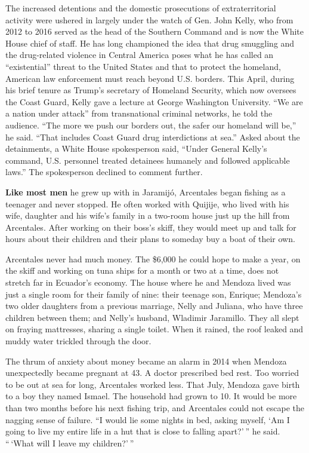 The increased detentions and the domestic prosecutions of
extraterritorial activity were ushered in largely under the watch of
Gen. John Kelly, who from 2012 to 2016 served as the head of the
Southern Command and is now the White House chief of staff. He has long
championed the idea that drug smuggling and the drug-related violence in
Central America poses what he has called an ``existential'' threat to
the United States and that to protect the homeland, American law
enforcement must reach beyond U.S. borders. This April, during his brief
tenure as Trump's secretary of Homeland Security, which now oversees the
Coast Guard, Kelly gave a lecture at George Washington University. ``We
are a nation under attack'' from transnational criminal networks, he
told the audience. ``The more we push our borders out, the safer our
homeland will be,'' he said. ``That includes Coast Guard drug
interdictions at sea.'' Asked about the detainments, a White House
spokesperson said, ``Under General Kelly's command, U.S. personnel
treated detainees humanely and followed applicable laws.'' The
spokesperson declined to comment further.

\textbf{Like most men} he grew up with in Jaramijó, Arcentales began
fishing as a teenager and never stopped. He often worked with Quijije,
who lived with his wife, daughter and his wife's family in a two-room
house just up the hill from Arcentales. After working on their boss's
skiff, they would meet up and talk for hours about their children and
their plans to someday buy a boat of their own.

Arcentales never had much money. The \$6,000 he could hope to make a
year, on the skiff and working on tuna ships for a month or two at a
time, does not stretch far in Ecuador's economy. The house where he and
Mendoza lived was just a single room for their family of nine: their
teenage son, Enrique; Mendoza's two older daughters from a previous
marriage, Nelly and Juliana, who have three children between them; and
Nelly's husband, Wladimir Jaramillo. They all slept on fraying
mattresses, sharing a single toilet. When it rained, the roof leaked and
muddy water trickled through the door.

The thrum of anxiety about money became an alarm in 2014 when Mendoza
unexpectedly became pregnant at 43. A doctor prescribed bed rest. Too
worried to be out at sea for long, Arcentales worked less. That July,
Mendoza gave birth to a boy they named Ismael. The household had grown
to 10. It would be more than two months before his next fishing trip,
and Arcentales could not escape the nagging sense of failure. ``I would
lie some nights in bed, asking myself, `Am I going to live my entire
life in a hut that is close to falling apart?' '' he said. `` `What will
I leave my children?' ''


